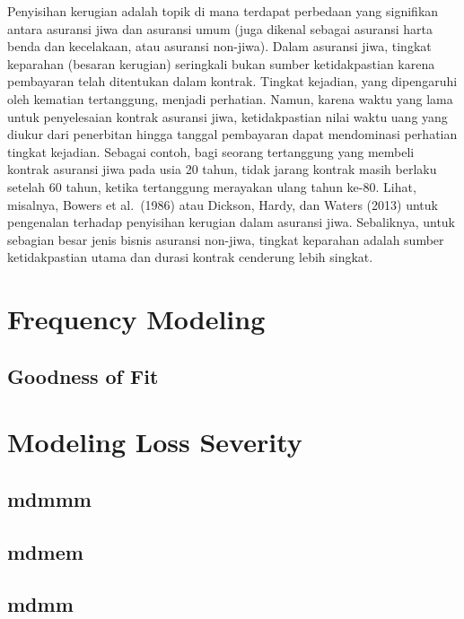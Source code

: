 \documentclass[
]{book}
\begin{document}
Penyisihan kerugian adalah topik di mana terdapat perbedaan yang signifikan antara asuransi jiwa dan asuransi umum (juga dikenal sebagai asuransi harta benda dan kecelakaan, atau asuransi non-jiwa). Dalam asuransi jiwa, tingkat keparahan (besaran kerugian) seringkali bukan sumber ketidakpastian karena pembayaran telah ditentukan dalam kontrak. Tingkat kejadian, yang dipengaruhi oleh kematian tertanggung, menjadi perhatian. Namun, karena waktu yang lama untuk penyelesaian kontrak asuransi jiwa, ketidakpastian nilai waktu uang yang diukur dari penerbitan hingga tanggal pembayaran dapat mendominasi perhatian tingkat kejadian. Sebagai contoh, bagi seorang tertanggung yang membeli kontrak asuransi jiwa pada usia 20 tahun, tidak jarang kontrak masih berlaku setelah 60 tahun, ketika tertanggung merayakan ulang tahun ke-80. Lihat, misalnya, Bowers et al.~(1986) atau Dickson, Hardy, dan Waters (2013) untuk pengenalan terhadap penyisihan kerugian dalam asuransi jiwa. Sebaliknya, untuk sebagian besar jenis bisnis asuransi non-jiwa, tingkat keparahan adalah sumber ketidakpastian utama dan durasi kontrak cenderung lebih singkat.

\hypertarget{frequency-modeling}{%
\chapter{Frequency Modeling}\label{frequency-modeling}}

\hypertarget{goodness-of-fit}{%
\section{Goodness of Fit}\label{goodness-of-fit}}

\hypertarget{modeling-loss-severity}{%
\chapter{Modeling Loss Severity}\label{modeling-loss-severity}}

\hypertarget{mdmmm}{%
\section{mdmmm}\label{mdmmm}}

\hypertarget{mdmem}{%
\section{mdmem}\label{mdmem}}

\hypertarget{mdmm}{%
\section{mdmm}\label{mdmm}}
\end{document}
